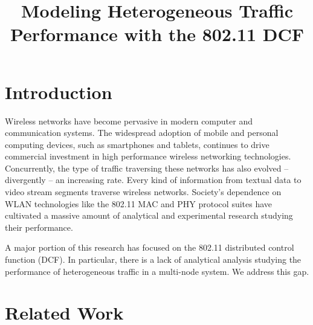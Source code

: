 \documentclass[conference]{IEEEtran}
\begin{document}
\title{Modeling Heterogeneous Traffic Performance with the 802.11 DCF}

\author{
}

\maketitle

\begin{abstract}
\end{abstract}

\begin{IEEEkeywords}
\end{IEEEkeywords}

\IEEEpeerreviewmaketitle

\section{Introduction}
Wireless networks have become pervasive in modern computer and communication systems. The widespread adoption of mobile and personal computing devices, such as smartphones and tablets, continues to drive commercial investment in high performance wireless networking technologies. Concurrently, the type of traffic traversing these networks has also evolved -- divergently -- an increasing rate. Every kind of information from textual data to video stream segments traverse wireless networks. Society's dependence on WLAN technologies like the 802.11 MAC and PHY protocol suites have cultivated a massive amount of analytical and experimental research studying their performance. 

A major portion of this research has focused on the 802.11 distributed control function (DCF). In particular, there is a lack of analytical analysis studying the performance of heterogeneous traffic in a multi-node system. We address this gap.

\section{Related Work}
\end{document}
